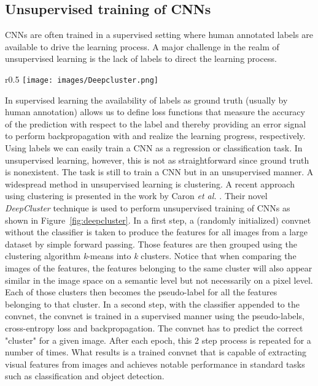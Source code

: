 \documentclass[a4paper,12pt]{report}
\begin{document}
\subsection{Unsupervised training of CNNs}\label{subsec:deepcluster}
CNNs are often trained in a supervised setting where human annotated labels are available to drive the learning process. A major challenge in the realm of unsupervised learning is the lack of labels to direct the learning process. 
\begin{wrapfigure}{r}{0.5\textwidth}
\texttt{[image: images/Deepcluster.png]} 
\caption{DeepCluster unsupervised training of CNNs \cite{DeepCluster}.}
\label{fig:deepcluster}
\end{wrapfigure}
In supervised learning the availability of labels as ground truth (usually by human annotation) allows us to define loss functions that measure the accuracy of the prediction with respect to the label and thereby providing an error signal to perform backpropagation with and realize the learning progress, respectively. Using labels we can easily train a CNN as a regression or classification task. In unsupervised learning, however, this is not as straightforward since ground truth is nonexistent. The task is still to train a CNN but in an unsupervised manner. A widespread method in unsupervised learning is clustering. A recent approach using clustering is presented in the work by Caron \textit{et al.} \cite{DeepCluster}. Their novel \textit{DeepCluster} technique is used to perform unsupervised training of CNNs as shown in Figure~\ref{fig:deepcluster}. In a first step, a (randomly initialized) convnet without the classifier is taken to produce the features for all images from a large dataset by simple forward passing. Those features are then grouped using the clustering algorithm \textit{k}-means into \textit{k} clusters. Notice that when comparing the images of the features, the features belonging to the same cluster will also appear similar in the image space on a semantic level but not necessarily on a pixel level. Each of those clusters then becomes the pseudo-label for all the features belonging to that cluster. In a second step, with the classifier appended to the convnet, the convnet is trained in a supervised manner using the pseudo-labels, cross-entropy loss and backpropagation. The convnet has to predict the correct "cluster" for a given image. After each epoch, this 2 step process is repeated for a number of times. What results is a trained convnet that is capable of extracting visual features from images and achieves notable performance in standard tasks such as classification and object detection.
\end{document}
